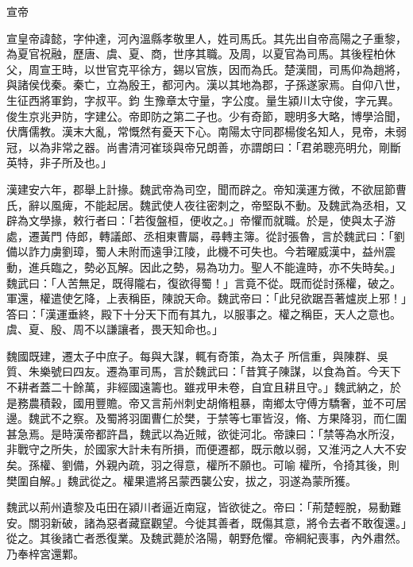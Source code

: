 
\begin{pinyinscope}

 宣帝



 宣皇帝諱懿，字仲達，河內溫縣孝敬里人，姓司馬氏。其先出自帝高陽之子重黎，為夏官祝融，歷唐、虞、夏、商，世序其職。及周，以夏官為司馬。其後程柏休父，周宣王時，以世官克平徐方，錫以官族，因而為氏。楚漢間，司馬仰為趙將，與諸侯伐秦。秦亡，立為殷王，都河內。漢以其地為郡，子孫遂家焉。自仰八世，生征西將軍鈞，字叔平。鈞
 生豫章太守量，字公度。量生潁川太守俊，字元異。俊生京兆尹防，字建公。帝即防之第二子也。少有奇節，聰明多大略，博學洽聞，伏膺儒教。漢末大亂，常慨然有憂天下心。南陽太守同郡楊俊名知人，見帝，未弱冠，以為非常之器。尚書清河崔琰與帝兄朗善，亦謂朗曰：「君弟聰亮明允，剛斷英特，非子所及也。」



 漢建安六年，郡舉上計掾。魏武帝為司空，聞而辟之。帝知漢運方微，不欲屈節曹氏，辭以風痺，不能起居。魏武使人夜往密刺之，帝堅臥不動。及魏武為丞相，又辟為文學掾，敕行者曰：「若復盤桓，便收之。」帝懼而就職。於是，使與太子游處，遷黃門
 侍郎，轉議郎、丞相東曹屬，尋轉主簿。從討張魯，言於魏武曰：「劉備以詐力虜劉璋，蜀人未附而遠爭江陵，此機不可失也。今若曜威漢中，益州震動，進兵臨之，勢必瓦解。因此之勢，易為功力。聖人不能違時，亦不失時矣。」魏武曰：「人苦無足，既得隴右，復欲得蜀！」言竟不從。既而從討孫權，破之。軍還，權遣使乞降，上表稱臣，陳說天命。魏武帝曰：「此兒欲踞吾著爐炭上邪！」答曰：「漢運垂終，殿下十分天下而有其九，以服事之。權之稱臣，天人之意也。虞、夏、殷、周不以謙讓者，畏天知命也。」



 魏國既建，遷太子中庶子。每與大謀，輒有奇策，為太子
 所信重，與陳群、吳質、朱樂號曰四友。遷為軍司馬，言於魏武曰：「昔箕子陳謀，以食為首。今天下不耕者蓋二十餘萬，非經國遠籌也。雖戎甲未卷，自宜且耕且守。」魏武納之，於是務農積穀，國用豐贍。帝又言荊州刺史胡脩粗暴，南鄉太守傅方驕奢，並不可居邊。魏武不之察。及蜀將羽圍曹仁於樊，于禁等七軍皆沒，脩、方果降羽，而仁圍甚急焉。是時漢帝都許昌，魏武以為近賊，欲徙河北。帝諫曰：「禁等為水所沒，非戰守之所失，於國家大計未有所損，而便遷都，既示敵以弱，又淮沔之人大不安矣。孫權、劉備，外親內疏，羽之得意，權所不願也。可喻
 權所，令掎其後，則樊圍自解。」魏武從之。權果遣將呂蒙西襲公安，拔之，羽遂為蒙所獲。



 魏武以荊州遺黎及屯田在潁川者逼近南寇，皆欲徙之。帝曰：「荊楚輕脫，易動難安。關羽新破，諸為惡者藏竄觀望。今徙其善者，既傷其意，將令去者不敢復還。」從之。其後諸亡者悉復業。及魏武薨於洛陽，朝野危懼。帝綱紀喪事，內外肅然。乃奉梓宮還鄴。




\end{pinyinscope}
